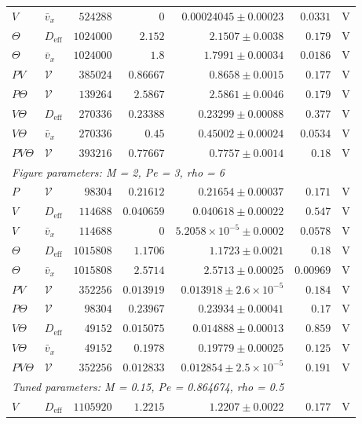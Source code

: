 \begin{longtable}{llrrrrc}
$V$ & $\bar v_x$ & $524288$ & $0$ & $0.00024045 \pm 0.00023$ & $0.0331$ & V \\
$\Theta$ & $D_{\mathrm{eff}}$ & $1024000$ & $2.152$ & $2.1507 \pm 0.0038$ & $0.179$ & V \\
$\Theta$ & $\bar v_x$ & $1024000$ & $1.8$ & $1.7991 \pm 0.00034$ & $0.0186$ & V \\
$PV$ & $\mathcal V$ & $385024$ & $0.86667$ & $0.8658 \pm 0.0015$ & $0.177$ & V \\
$P\Theta$ & $\mathcal V$ & $139264$ & $2.5867$ & $2.5861 \pm 0.0046$ & $0.179$ & V \\
$V\Theta$ & $D_{\mathrm{eff}}$ & $270336$ & $0.23388$ & $0.23299 \pm 0.00088$ & $0.377$ & V \\
$V\Theta$ & $\bar v_x$ & $270336$ & $0.45$ & $0.45002 \pm 0.00024$ & $0.0534$ & V \\
$PV\Theta$ & $\mathcal V$ & $393216$ & $0.77667$ & $0.7757 \pm 0.0014$ & $0.18$ & V \\
\multicolumn{7}{l}{\textit{Figure parameters: M = 2, Pe = 3, rho = 6}} \\
$P$ & $\mathcal V$ & $98304$ & $0.21612$ & $0.21654 \pm 0.00037$ & $0.171$ & V \\
$V$ & $D_{\mathrm{eff}}$ & $114688$ & $0.040659$ & $0.040618 \pm 0.00022$ & $0.547$ & V \\
$V$ & $\bar v_x$ & $114688$ & $0$ & $5.2058\times10^{-5} \pm 0.0002$ & $0.0578$ & V \\
$\Theta$ & $D_{\mathrm{eff}}$ & $1015808$ & $1.1706$ & $1.1723 \pm 0.0021$ & $0.18$ & V \\
$\Theta$ & $\bar v_x$ & $1015808$ & $2.5714$ & $2.5713 \pm 0.00025$ & $0.00969$ & V \\
$PV$ & $\mathcal V$ & $352256$ & $0.013919$ & $0.013918 \pm 2.6\times10^{-5}$ & $0.184$ & V \\
$P\Theta$ & $\mathcal V$ & $98304$ & $0.23967$ & $0.23934 \pm 0.00041$ & $0.17$ & V \\
$V\Theta$ & $D_{\mathrm{eff}}$ & $49152$ & $0.015075$ & $0.014888 \pm 0.00013$ & $0.859$ & V \\
$V\Theta$ & $\bar v_x$ & $49152$ & $0.1978$ & $0.19779 \pm 0.00025$ & $0.125$ & V \\
$PV\Theta$ & $\mathcal V$ & $352256$ & $0.012833$ & $0.012854 \pm 2.5\times10^{-5}$ & $0.191$ & V \\
\multicolumn{7}{l}{\textit{Tuned parameters: M = 0.15, Pe = 0.864674, rho = 0.5}} \\
$V$ & $D_{\mathrm{eff}}$ & $1105920$ & $1.2215$ & $1.2207 \pm 0.0022$ & $0.177$ & V \\

\end{longtable}
